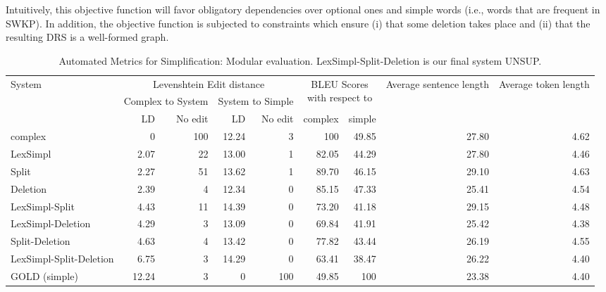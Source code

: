 \documentclass[11pt,a4paper]{article}
\begin{document}
Intuitively, this objective function will favor obligatory
dependencies over optional ones and simple words (i.e., words that are
frequent in SWKP). In addition, the objective function is subjected to
constraints which ensure (i) that some deletion takes place and (ii)
that the resulting DRS is a well-formed graph.








\begin{table*}[htbp]
  \begin{center}
    \begin{footnotesize}
      \begin{tabular}{|p{4.3cm}|rr|rr|rr|r|r|}\hline

        \multirow{3}{*}{System} &
        \multicolumn{4}{|c|}{\parbox{4cm}{Levenshtein Edit distance}}
        & \multicolumn{2}{|c|}{\multirow{2}{*}{\parbox{2cm}{BLEU
              Scores \\ with respect to}}} &
        \multirow{3}{*}{\parbox{1.2cm}{Average sentence length}} &
        \multirow{3}{*}{\parbox{1.2cm}{Average token
            length}}\\ \cline{2-5}

        & \multicolumn{2}{|c|}{\parbox{2cm}{Complex to System}} &
        \multicolumn{2}{|c|}{\parbox{2cm}{System to Simple}} & & & &
        \\ \cline{2-7}
        
        & LD & No edit & LD & No edit & complex & simple & &  \\ \hline
        
        complex & 0 & 100 & 12.24 & 3 & 100 & 49.85 & 27.80 & 4.62 \\
        LexSimpl & 2.07 & 22  & 13.00 & 1 & 82.05 & 44.29 & 27.80 & 4.46 \\
        Split & 2.27 & 51 & 13.62 & 1 & 89.70 & 46.15 & 29.10 & 4.63 \\
        Deletion & 2.39 & 4 & 12.34 & 0 & 85.15 & 47.33 & 25.41 & 4.54 \\
        LexSimpl-Split & 4.43 & 11 & 14.39 & 0 & 73.20 & 41.18 & 29.15 & 4.48 \\
        LexSimpl-Deletion & 4.29 & 3 & 13.09 & 0 & 69.84 & 41.91 & 25.42 & 4.38 \\
        Split-Deletion & 4.63 & 4 & 13.42 & 0 & 77.82 & 43.44 & 26.19 & 4.55 \\
        LexSimpl-Split-Deletion & 6.75 & 3 & 14.29 & 0 & 63.41 & 38.47 & 26.22 & 4.40 \\
        GOLD (simple) & 12.24 & 3 & 0 & 100 & 49.85 & 100 & 23.38 & 4.40 \\ \hline 

      \end{tabular}
      \caption{\small Automated Metrics for Simplification: Modular
        evaluation. LexSimpl-Split-Deletion is our final system
        UNSUP.}\label{tab:modular}
      \vspace{-0.5cm}
    \end{footnotesize}
  \end{center}
\end{table*}
\end{document}
